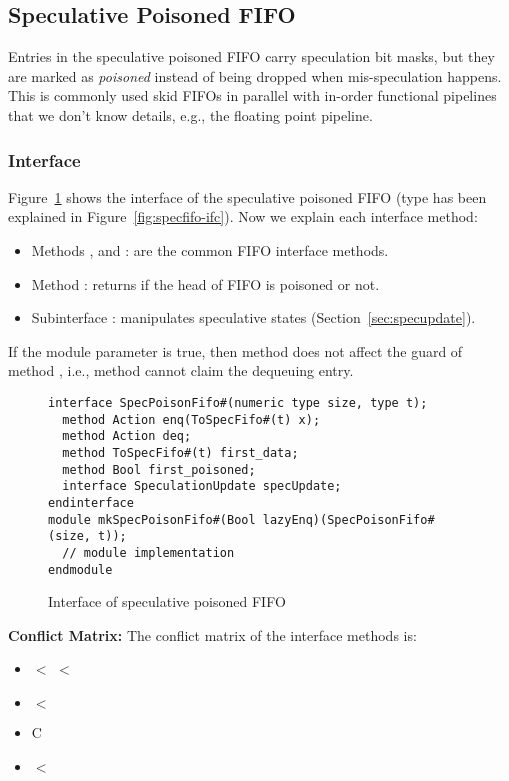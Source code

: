\subsection{Speculative Poisoned FIFO}\label{sec:specpoisonfifo}

Entries in the speculative poisoned FIFO carry speculation bit masks, but they are marked as \emph{poisoned} instead of being dropped when mis-speculation happens.
This is commonly used skid FIFOs in parallel with in-order functional pipelines that we don't know details, e.g., the floating point pipeline.

\subsubsection{Interface}
Figure~\ref{fig:specpoisonfifo-ifc} shows the interface of the speculative poisoned FIFO (type  has been explained in Figure~\ref{fig:specfifo-ifc}).
Now we explain each interface method:
\begin{itemize}
    \item Methods ,  and : are the common FIFO interface methods.
    \item Method : returns if the head of FIFO is poisoned or not.
    \item Subinterface : manipulates speculative states (Section~\ref{sec:specupdate}).
\end{itemize}
If the module parameter  is true, then method  does not affect the guard of method , i.e., method  cannot claim the dequeuing entry.

\begin{figure}[t]
\begin{lstlisting}[caption={}]
interface SpecPoisonFifo#(numeric type size, type t);
  method Action enq(ToSpecFifo#(t) x);
  method Action deq;
  method ToSpecFifo#(t) first_data;
  method Bool first_poisoned;
  interface SpeculationUpdate specUpdate;
endinterface
module mkSpecPoisonFifo#(Bool lazyEnq)(SpecPoisonFifo#(size, t));
  // module implementation
endmodule
\end{lstlisting}
\caption{Interface of speculative poisoned FIFO}\label{fig:specpoisonfifo-ifc}
\end{figure}

\noindent\textbf{Conflict Matrix:}
The conflict matrix of the interface methods is:
\begin{itemize}
    \item {} $<$  $<$ 
    \item {} $<$ 
    \item {} C 
    \item {} $<$ 
\end{itemize}

